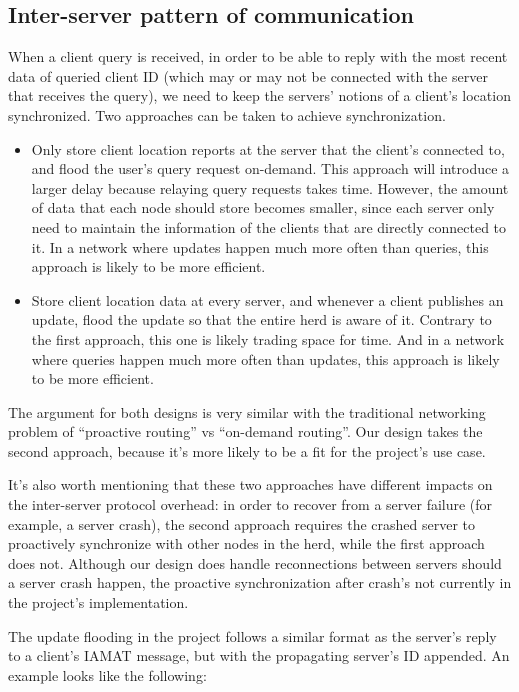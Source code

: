 \documentclass[letterpaper,twocolumn,10pt]{article}
\begin{document}
\subsection{Inter-server pattern of communication} 
When a client query is received, in order to be able to reply with the most recent data of queried client ID (which may or may not be connected with the server that receives the query), we need to keep the servers' notions of a client's location synchronized. Two approaches can be taken to achieve synchronization.
\begin{itemize}
\item Only store client location reports at the server that the client's connected to, and flood the user's query request on-demand. This approach will introduce a larger delay because relaying query requests takes time. However, the amount of data that each node should store becomes smaller, since each server only need to maintain the information of the clients that are directly connected to it. In a network where updates happen much more often than queries, this approach is likely to be more efficient.
\item Store client location data at every server, and whenever a client publishes an update, flood the update so that the entire herd is aware of it. Contrary to the first approach, this one is likely trading space for time. And in a network where queries happen much more often than updates, this approach is likely to be more efficient.
\end{itemize}
The argument for both designs is very similar with the traditional networking problem of ``proactive routing'' vs ``on-demand routing''. Our design takes the second approach, because it's more likely to be a fit for the project's use case.

It's also worth mentioning that these two approaches have different impacts on the inter-server protocol overhead: in order to recover from a server failure (for example, a server crash), the second approach requires the crashed server to proactively synchronize with other nodes in the herd, while the first approach does not. Although our design does handle reconnections between servers should a server crash happen, the proactive synchronization after crash's not currently in the project's implementation.

The update flooding in the project follows a similar format as the server's reply to a client's IAMAT message, but with the propagating server's ID appended. An example looks like the following: 
\end{document}
